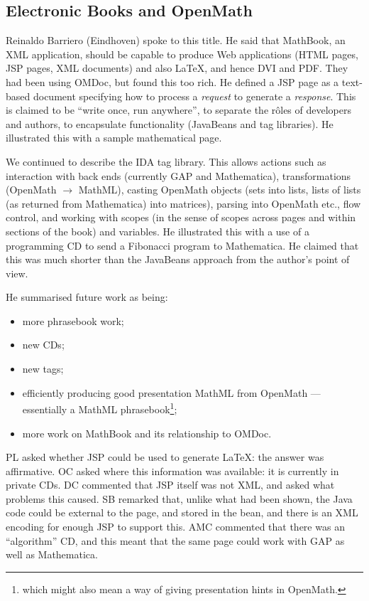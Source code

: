 \documentclass[11pt, a4paper]{article}
\begin{document}
\subsection{Electronic Books and OpenMath}
Reinaldo Barriero (Eindhoven) spoke to this title.
He said that MathBook, an XML application, should be capable to produce
Web applications (HTML pages, JSP pages, XML documents) and also \LaTeX, and
hence DVI and PDF. They had been using OMDoc, but found this too rich. He
defined a JSP page as a text-based document specifying how to process a
{\it request\/} to generate a {\it response\/}. This is claimed to be
``write once, run anywhere'', to separate the r\^oles of developers and
authors, to encapsulate functionality (JavaBeans and tag libraries). He
illustrated this with a sample mathematical page.
\par
We continued to describe the IDA tag library. This allows actions such as
interaction with back ends (currently GAP and Mathematica), transformations
(OpenMath $\rightarrow$ MathML), casting OpenMath objects (sets into lists,
lists of lists (as returned from Mathematica) into matrices), parsing into
OpenMath etc., flow control, and working with scopes (in the sense of
scopes across pages and within sections of the book) and variables. He
illustrated this with a use of a programming CD to send a Fibonacci program
to Mathematica. He claimed that this was much shorter than the JavaBeans
approach from the author's point of view.
\par
He summarised future work as being:
\begin{itemize}
\item more phrasebook work;
\item new CDs;
\item new tags;
\item efficiently producing good presentation MathML from OpenMath ---
essentially a MathML phrasebook\footnote{which might also mean a way of
giving presentation hints in OpenMath.};
\item more work on MathBook and its relationship to OMDoc.
\end{itemize}
PL asked whether JSP could be used to generate \LaTeX: the answer was
affirmative. OC asked where this information was available: it is currently
in private CDs. DC commented that JSP itself was not XML, and asked what
problems this caused. SB remarked that, unlike what had been shown, the
Java code could be external to the page, and stored in the bean, and there
is an XML encoding for enough JSP to support this. AMC commented that there
was an ``algorithm'' CD, and this meant that the same page could work with
GAP as well as Mathematica.
\end{document}
